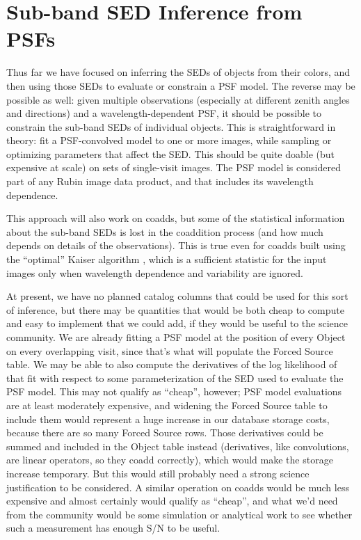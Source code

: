 \documentclass[DM,authoryear,toc]{lsstdoc}
\begin{document}
\section{Sub-band SED Inference from PSFs}

\label{sec:sub-band-sed-inference}

Thus far we have focused on inferring the SEDs of objects from their colors, and then using those SEDs to evaluate or constrain a PSF model.
The reverse may be possible as well: given multiple observations (especially at different zenith angles and directions) and a wavelength-dependent PSF, it should be possible to constrain the sub-band SEDs of individual objects.
This is straightforward in theory: fit a PSF-convolved model to one or more images, while sampling or optimizing parameters that affect the SED.
This should be quite doable (but expensive at scale) on sets of single-visit images.
The PSF model is considered part of any Rubin image data product, and that includes its wavelength dependence.

This approach will also work on coadds, but some of the statistical information about the sub-band SEDs is lost in the coaddition process (and how much depends on details of the observations).
This is true even for coadds built using the ``optimal'' Kaiser algorithm \citep{dmtn-015,Kaiser04,2017ApJ...836..188Z}, which is a sufficient statistic for the input images only when wavelength dependence and variability are ignored.

At present, we have no planned catalog columns that could be used for this sort of inference, but there may be quantities that would be both cheap to compute and easy to implement that we could add, if they would be useful to the science community.
We are already fitting a PSF model at the position of every Object on every overlapping visit, since that's what will populate the Forced Source table.
We may be able to also compute the derivatives of the log likelihood of that fit with respect to some parameterization of the SED used to evaluate the PSF model.
This may not qualify as ``cheap'', however; PSF model evaluations are at least moderately expensive, and widening the Forced Source table to include them would represent a huge increase in our database storage costs, because there are so many Forced Source rows.
Those derivatives could be summed and included in the Object table instead (derivatives, like convolutions, are linear operators, so they coadd correctly), which would make the storage increase temporary.
But this would still probably need a strong science justification to be considered.
A similar operation on coadds would be much less expensive and almost certainly would qualify as ``cheap'', and what we'd need from the community would be some simulation or analytical work to see whether such a measurement has enough S/N to be useful.
\end{document}
